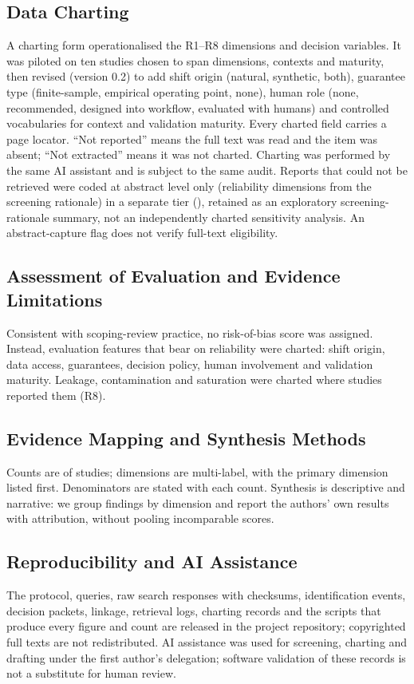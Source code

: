 \documentclass[journal]{IEEEtran}
\begin{document}
\subsection{Data Charting}
A charting form operationalised the R1--R8 dimensions and decision variables. It was piloted on ten studies chosen to span dimensions, contexts and maturity, then revised (version 0.2) to add shift origin (natural, synthetic, both), guarantee type (finite-sample, empirical operating point, none), human role (none, recommended, designed into workflow, evaluated with humans) and controlled vocabularies for context and validation maturity. Every charted field carries a page locator. ``Not reported'' means the full text was read and the item was absent; ``Not extracted'' means it was not charted. Charting was performed by the same AI assistant and is subject to the same audit. Reports that could not be retrieved were coded at abstract level only (reliability dimensions from the screening rationale) in a separate tier (), retained as an exploratory screening-rationale summary, not an independently charted sensitivity analysis. An abstract-capture flag does not verify full-text eligibility.

\subsection{Assessment of Evaluation and Evidence Limitations}
Consistent with scoping-review practice, no risk-of-bias score was assigned. Instead, evaluation features that bear on reliability were charted: shift origin, data access, guarantees, decision policy, human involvement and validation maturity. Leakage, contamination and saturation were charted where studies reported them (R8).

\subsection{Evidence Mapping and Synthesis Methods}
Counts are of studies; dimensions are multi-label, with the primary dimension listed first. Denominators are stated with each count. Synthesis is descriptive and narrative: we group findings by dimension and report the authors' own results with attribution, without pooling incomparable scores.

\subsection{Reproducibility and AI Assistance}
The protocol, queries, raw search responses with checksums, identification events, decision packets, linkage, retrieval logs, charting records and the scripts that produce every figure and count are released in the project repository; copyrighted full texts are not redistributed. AI assistance was used for screening, charting and drafting under the first author's delegation; software validation of these records is not a substitute for human review.
\end{document}
